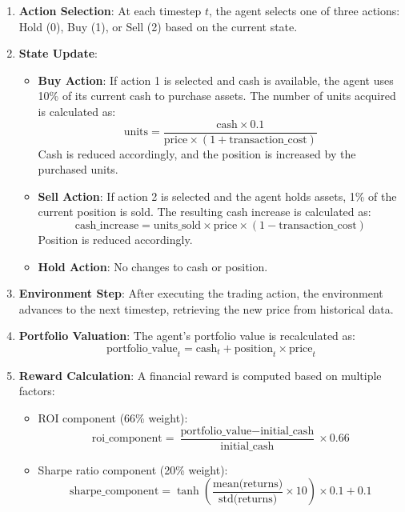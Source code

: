 \documentclass[11pt]{article}
\begin{document}
\begin{enumerate}
  \item \textbf{Action Selection}: At each timestep \(t\), the agent selects one of three actions: Hold (0), Buy (1), or Sell (2) based on the current state.
  
  \item \textbf{State Update}:
  \begin{itemize}
    \item \textbf{Buy Action}: If action 1 is selected and cash is available, the agent uses 10\% of its current cash to purchase assets. The number of units acquired is calculated as:
    \[ \text{units} = \frac{\text{cash} \times 0.1}{\text{price} \times (1 + \text{transaction\_cost})} \]
    Cash is reduced accordingly, and the position is increased by the purchased units.
    
    \item \textbf{Sell Action}: If action 2 is selected and the agent holds assets, 1\% of the current position is sold. The resulting cash increase is calculated as:
    \[ \text{cash\_increase} = \text{units\_sold} \times \text{price} \times (1 - \text{transaction\_cost}) \]
    Position is reduced accordingly.
    
    \item \textbf{Hold Action}: No changes to cash or position.
  \end{itemize}
  
  \item \textbf{Environment Step}: After executing the trading action, the environment advances to the next timestep, retrieving the new price from historical data.
  
  \item \textbf{Portfolio Valuation}: The agent's portfolio value is recalculated as:
  \[ \text{portfolio\_value}_t = \text{cash}_t + \text{position}_t \times \text{price}_t \]
  
  \item \textbf{Reward Calculation}: A financial reward is computed based on multiple factors:
  \begin{itemize}
    \item ROI component (66\% weight): \[ \text{roi\_component} = \frac{\text{portfolio\_value} - \text{initial\_cash}}{\text{initial\_cash}} \times 0.66 \]
    
    \item Sharpe ratio component (20\% weight): \[ \text{sharpe\_component} = \tanh\left(\frac{\text{mean(returns)}}{\text{std(returns)}} \times 10\right) \times 0.1 + 0.1 \]
    

\end{itemize}
\end{enumerate}
\end{document}
